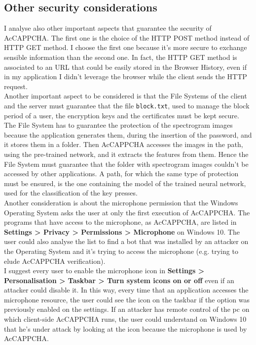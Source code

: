 \subsection{Other security considerations}
I analyse also other important aspects that guarantee the security of AcCAPPCHA. The first one is the choice of the HTTP POST method instead of HTTP GET method. I choose the first one because it's more secure to exchange sensible information than the second one. In fact, the HTTP GET method is associated to an URL that could be easily stored in the Browser History, even if in my application I didn't leverage the browser while the client sends the HTTP request.\\
Another important aspect to be considered is that the File Systems of the client and the server must guarantee that the file \texttt{block.txt}, used to manage the block period of a user, the encryption keys and the certificates must be kept secure. The File System has to guarantee the protection of the spectrogram images because the application generates them, during the insertion of the password, and it stores them in a folder. Then AcCAPPCHA accesses the images in the path, using the pre-trained network, and it extracts the features from them. Hence the File System must guarantee that the folder with spectrogram images couldn't be accessed by other applications. A path, for which the same type of protection must be ensured, is the one containing the model of the trained neural network, used for the classification of the key presses.\\
Another consideration is about the microphone permission that the Windows Operating System asks the user at only the first execution of AcCAPPCHA. The programs that have access to the microphone, as AcCAPPCHA, are listed in \textbf{Settings > Privacy > Permissions > Microphone} on Windows 10. The user could also analyse the list to find a bot that was installed by an attacker on the Operating System and it's trying to access the microphone (e.g. trying to elude AcCAPPCHA verification).\\
I suggest every user to enable the microphone icon in \textbf{Settings > Personalisation > Taskbar > Turn system icons on or off} even if an attacker could disable it. In this way, every time that an application accesses the microphone resource, the user could see the icon on the taskbar if the option was previously enabled on the settings. If an attacker has remote control of the pc on which client-side AcCAPPCHA runs, the user could understand on Windows 10 that he's under attack by looking at the icon because the microphone is used by AcCAPPCHA.\\

